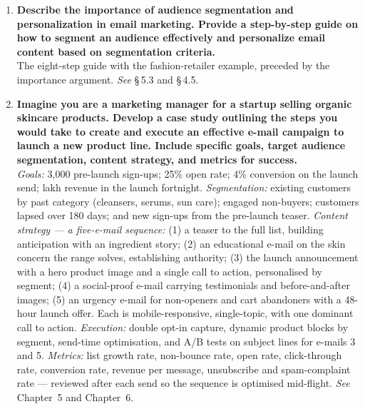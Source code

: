 \begin{enumerate}[leftmargin=2.2em,itemsep=1.4ex]
      \smallskip
      \emph{Conclusion:} the failure was not a creative failure but a
      \textbf{research failure} --- the campaign was designed from assumption
      rather than from audience data. \hfill\emph{See} \S\,6.2 and \S\,6.3.

\item \textbf{Describe the importance of audience segmentation and
      personalization in email marketing. Provide a step-by-step guide on how to
      segment an audience effectively and personalize email content based on
      segmentation criteria.} \\
      The eight-step guide with the fashion-retailer example, preceded by the
      importance argument. \hfill\emph{See} \S\,5.3 and \S\,4.5.

\item \textbf{Imagine you are a marketing manager for a startup selling organic
      skincare products. Develop a case study outlining the steps you would take
      to create and execute an effective e-mail campaign to launch a new product
      line. Include specific goals, target audience segmentation, content
      strategy, and metrics for success.}
      \\
      \emph{Goals:} 3,000 pre-launch sign-ups; 25\% open rate; 4\% conversion on
      the launch send;  lakh revenue in the launch fortnight.
      \emph{Segmentation:} existing customers by past category (cleansers,
      serums, sun care); engaged non-buyers; customers lapsed over 180 days; and
      new sign-ups from the pre-launch teaser.
      \emph{Content strategy --- a five-e-mail sequence:} (1) a teaser to the
      full list, building anticipation with an ingredient story; (2) an
      educational e-mail on the skin concern the range solves, establishing
      authority; (3) the launch announcement with a hero product image and a
      single call to action, personalised by segment; (4) a social-proof e-mail
      carrying testimonials and before-and-after images; (5) an urgency e-mail
      for non-openers and cart abandoners with a 48-hour launch offer. Each is
      mobile-responsive, single-topic, with one dominant call to action.
      \emph{Execution:} double opt-in capture, dynamic product blocks by segment,
      send-time optimisation, and A/B tests on subject lines for e-mails 3 and 5.
      \emph{Metrics:} list growth rate, non-bounce rate, open rate,
      click-through rate, conversion rate, revenue per message, unsubscribe and
      spam-complaint rate --- reviewed after each send so the sequence is
      optimised mid-flight. \hfill\emph{See} Chapter~5 and Chapter~6.


\end{enumerate}
